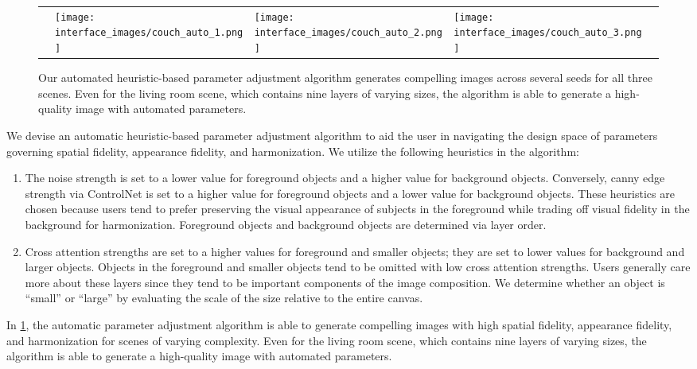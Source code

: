 \begin{figure}
\begin{adjustbox}{max size={\linewidth}{\textheight}}
\begin{tabular}[t]{p{.2\linewidth}|p{.2\linewidth}|p{.2\linewidth}p{.2\linewidth}p{.2\linewidth}}
         & \texttt{[image: interface\_images/couch\_auto\_1.png]} & \texttt{[image: interface\_images/couch\_auto\_2.png]} & \texttt{[image: interface\_images/couch\_auto\_3.png]} \\
        \end{tabular}
    \end{adjustbox}
    \caption{Our automated heuristic-based parameter adjustment algorithm generates compelling images across several seeds for all three scenes. Even for the living room scene, which contains nine layers of varying sizes, the algorithm is able to generate a high-quality image with automated parameters.}
    \label{fig:autoparams}
\end{figure}

We devise an automatic heuristic-based parameter adjustment algorithm to aid the user in navigating the design space of parameters governing spatial fidelity, appearance fidelity, and harmonization. We utilize the following heuristics in the algorithm:
\begin{enumerate}
    \item The noise strength is set to a lower value for foreground objects and a higher value for background objects. Conversely, canny edge strength via ControlNet is set to a higher value for foreground objects and a lower value for background objects.  These heuristics are chosen because users tend to prefer preserving the visual appearance of subjects in the foreground while trading off visual fidelity in the background for harmonization. Foreground objects and background objects are determined via layer order.
    \item Cross attention strengths are set to a higher values for foreground and smaller objects; they are set to lower values for background and larger objects. Objects in the foreground and smaller objects tend to be omitted with low cross attention strengths. Users generally care more about these layers since they tend to be important components of the image composition. We determine whether an object is “small” or “large” by evaluating the scale of the size relative to the entire canvas.
\end{enumerate}

In \cref{fig:autoparams}, the automatic parameter adjustment algorithm is able to generate compelling images with high spatial fidelity, appearance fidelity, and harmonization for scenes of varying complexity. Even for the living room scene, which contains nine layers of varying sizes, the algorithm is able to generate a high-quality image with automated parameters.

